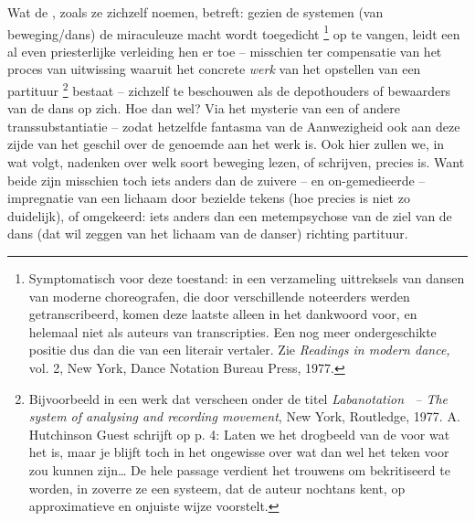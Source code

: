 {Wat de , zoals ze zichzelf noemen, betreft: gezien de systemen (van beweging/dans) de miraculeuze macht wordt toegedicht  \footnote{Symptomatisch voor deze toestand: in een verzameling uittreksels van dansen van moderne choreografen, die door verschillende noteerders werden getranscribeerd, komen deze laatste alleen in het dankwoord voor, en helemaal niet als auteurs van transcripties. Een nog meer ondergeschikte positie dus dan die van een literair vertaler. Zie {\em Readings in modern dance,} vol. 2, New York, Dance Notation Bureau Press, 1977.} op te vangen, leidt een al even priesterlijke verleiding hen er toe {--} misschien ter compensatie van het proces van uitwissing waaruit het concrete {\em werk} van het opstellen van een partituur \footnote{Bijvoorbeeld in een werk dat verscheen onder de titel {\em Labanotation \ {--} The system of analysing and recording movement}, New York, Routledge, 1977. A. Hutchinson Guest schrijft op p. 4:  Laten we het drogbeeld van de  voor wat het is, maar je blijft toch in het ongewisse over wat dan wel het teken voor  zou kunnen zijn{\dots} De hele passage verdient het trouwens om bekritiseerd te worden, in zoverre ze een systeem, dat de auteur nochtans kent, op approximatieve en onjuiste wijze voorstelt.} bestaat {--} zichzelf te beschouwen als de depothouders of bewaarders van de dans op zich. Hoe dan wel? Via het mysterie van een of andere transsubstantiatie {--} zodat hetzelfde fantasma van de Aanwezigheid ook aan deze zijde van het geschil over de genoemde  aan het werk is. Ook hier zullen we, in wat volgt, nadenken over welk soort beweging lezen, of schrijven, precies is. Want beide zijn misschien toch iets anders dan de zuivere {--} en on{}-gemedieerde {--} impregnatie van een lichaam door bezielde tekens (hoe precies is niet zo duidelijk), of omgekeerd: iets anders dan een metempsychose van de ziel van de dans (dat wil zeggen van het lichaam van de danser) richting partituur.

}
